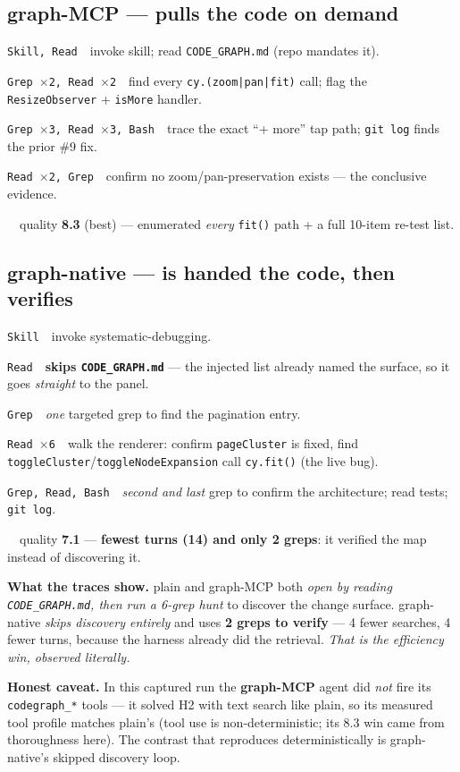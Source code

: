 \documentclass[11pt]{article}
\newcommand{\native}[1]{\textcolor{native}{\textbf{#1}}}
\newcommand{\mcp}[1]{\textcolor{mcp}{\textbf{#1}}}
\newenvironment{keyfind}{%
  \def\FrameCommand{\color{panelln}\vrule width 3pt\hspace{8pt}%
    \fboxsep=8pt\colorbox{panelbg}}%
  \MakeFramed{\hsize\dimexpr\linewidth-11pt\relax\FrameRestore}}{\endMakeFramed}
\newenvironment{caveat}{%
  \def\FrameCommand{\color{rule}\vrule width 2pt\hspace{8pt}\fboxsep=7pt\colorbox{greybg}}%
  \MakeFramed{\hsize\dimexpr\linewidth-9pt\relax\FrameRestore}\small}{\endMakeFramed}
\newcommand{\stp}[3]{\item[\textcolor{plainc}{\footnotesize\sffamily #1}]{\small\texttt{#2}}\ \ {\footnotesize #3}}
\newenvironment{trace}{\begin{list}{}{\setlength{\leftmargin}{2.0em}\setlength{\labelwidth}{1.6em}%
  \setlength{\itemsep}{1.5pt}\setlength{\topsep}{3pt}}}{\end{list}}
\begin{document}
\subsection{\mcp{graph-MCP} --- pulls the code on demand}
\begin{trace}
\stp{1--2.}{Skill, Read}{invoke skill; read \texttt{CODE\_GRAPH.md} (repo mandates it).}
\stp{3--6.}{Grep $\times$2, Read $\times$2}{find every \texttt{cy.(zoom|pan|fit)} call; flag the \texttt{ResizeObserver} + \texttt{isMore} handler.}
\stp{7--13.}{Grep $\times$3, Read $\times$3, Bash}{trace the exact ``+ more'' tap path; \texttt{git log} finds the prior \#9 fix.}
\stp{14--16.}{Read $\times$2, Grep}{confirm no zoom/pan-preservation exists --- the conclusive evidence.}
\stp{$\Rightarrow$}{}{quality \mcp{8.3} (best) --- enumerated \emph{every} \texttt{fit()} path + a full 10-item re-test list.}
\end{trace}

\subsection{\native{graph-native} --- is handed the code, then verifies}
\begin{trace}
\stp{1.}{Skill}{invoke systematic-debugging.}
\stp{2.}{Read}{\textbf{skips \texttt{CODE\_GRAPH.md}} --- the injected list already named the surface, so it goes \emph{straight} to the panel.}
\stp{3.}{Grep}{\emph{one} targeted grep to find the pagination entry.}
\stp{4--9.}{Read $\times$6}{walk the renderer: confirm \texttt{pageCluster} is fixed, find \texttt{toggleCluster}/\texttt{toggleNodeExpansion} call \texttt{cy.fit()} (the live bug).}
\stp{10--12.}{Grep, Read, Bash}{\emph{second and last} grep to confirm the architecture; read tests; \texttt{git log}.}
\stp{$\Rightarrow$}{}{quality \textbf{7.1} --- \native{fewest turns (14) and only 2 greps}: it verified the map instead of discovering it.}
\end{trace}

\begin{keyfind}
\textbf{What the traces show.} plain and graph-MCP both \emph{open by reading \texttt{CODE\_GRAPH.md},
then run a 6-grep hunt} to discover the change surface. graph-native \emph{skips discovery entirely}
and uses \native{2 greps to verify} --- 4 fewer searches, 4 fewer turns, because the harness already
did the retrieval. \emph{That is the efficiency win, observed literally.}
\end{keyfind}

\begin{caveat}
\textbf{Honest caveat.} In this captured run the \mcp{graph-MCP} agent did \emph{not} fire its
\texttt{codegraph\_*} tools --- it solved H2 with text search like plain, so its measured tool profile
matches plain's (tool use is non-deterministic; its 8.3 win came from thoroughness here). The contrast
that reproduces deterministically is graph-native's skipped discovery loop.
\end{caveat}
\end{document}
